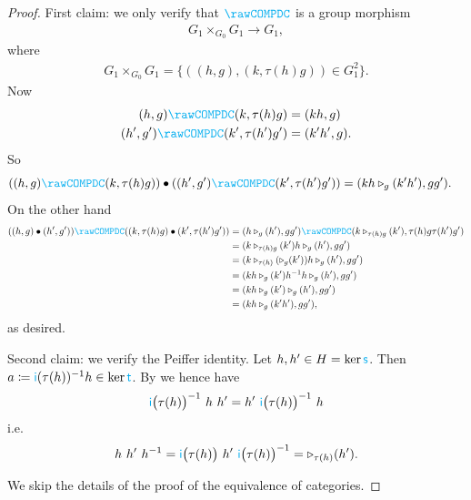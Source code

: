\documentclass[noamsfonts, reqno]{amsart}
\newcommand\sDC{\mathcolor{cyan}{\mathsf{s}}}
\newcommand\tDC{\mathcolor{cyan}{\mathsf{t}}}
\newcommand\iDC{\mathcolor{cyan}{\mathsf{i}}}
\newcommand{\COMPDC}{\mathcolor{cyan}{\rawCOMPDC}}
\newcommand\feedbackGG{\tau}        %
\newcommand\actionGG{\triangleright}             %
\begin{document}
\begin{proof}
	First claim:
	we only verify that $\COMPDC$ is a group morphism
	\begin{align*}
		G_1 \times_{G_0} G_1 \to G_1,
	\end{align*}
	where
	\begin{align*}
		G_1 \times_{G_0} G_1 = \{ ( (h,g), (k, \feedbackGG(h) g) ) \in G_1^2 \}.
	\end{align*}
	Now
	\begin{align*}
		(h,g)   \COMPDC (k, \feedbackGG(h) g)    &= (k h, g) \\
		(h',g') \COMPDC (k', \feedbackGG(h') g') &= (k' h', g).
	\end{align*}
	So 
	\begin{align*}
		( (h,g)   \COMPDC (k, \feedbackGG(h) g) ) \bullet ( (h',g') \COMPDC (k', \feedbackGG(h') g') )
		&=
		(k h \actionGG_g( k' h' ), g g').
	\end{align*}
	On the other hand
	\begin{align*}
		( (h,g)\bullet (h',g') ) \COMPDC ( (k, \feedbackGG(h) g) \bullet (k', \feedbackGG(h') g') )
		&=
		(h \actionGG_g(h'), g g') \COMPDC (k \actionGG_{\feedbackGG(h) g}(k'), \feedbackGG(h) g \feedbackGG(h') g') \\
		&=
		(k \actionGG_{\feedbackGG(h) g}(k') h \actionGG_g(h'), g g') \\
		&=
		(k \actionGG_{\feedbackGG(h)}( \actionGG_g(k') ) h \actionGG_g(h'), g g') \\
		&=	
		(k h \actionGG_g(k') h^{-1} h \actionGG_g(h'), g g') \\
		&=
		(k h \actionGG_g(k') \actionGG_g(h'), g g') \\
		&=
		(k h \actionGG_g(k' h'), g g'),
	\end{align*}
	as desired.

	Second claim:
	we verify the Peiffer identity.
	Let $h, h' \in H = \ker \sDC$.
	Then $a \coloneqq \iDC(\feedbackGG(h))^{-1} h \in \ker \tDC$.
	By  we hence have
	\begin{align*}
		\iDC\big(\feedbackGG(h)\big)^{-1}\ h\ h'
		=
		h'\ \iDC\big(\feedbackGG(h)\big)^{-1}\ h 
	\end{align*}
	i.e.
	\begin{align*}
		h\ h'\ h^{-1}
		=
		\iDC\big(\feedbackGG(h)\big)\ h'\ \iDC\big(\feedbackGG(h)\big)^{-1}
		=
		\actionGG_{\feedbackGG(h)}(h').
	\end{align*}

	We skip the details of the proof of the equivalence of categories.
\end{proof}
\end{document}
